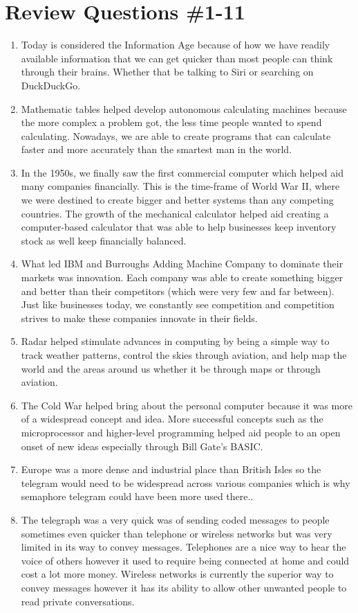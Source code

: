 \documentclass[12pt,a4paper]{article}
\begin{document}
\section{Review Questions \#1-11}
    \begin{enumerate}
        \item Today is considered the Information Age because of how we have readily available information that we can get quicker than most people can think through their brains. Whether that be talking to Siri or searching on DuckDuckGo.
        \item Mathematic tables helped develop autonomous calculating machines because the more complex a problem got, the less time people wanted to spend calculating. Nowadays, we are able to create programs that can calculate faster and more accurately than the smartest man in the world.
        \item In the 1950s, we finally saw the first commercial computer which helped aid many companies financially. This is the time-frame of World War II, where we were destined to create bigger and better systems than any competing countries. The growth of the mechanical calculator helped aid creating a computer-based calculator that was able to help businesses keep inventory stock as well keep financially balanced.
        \item What led IBM and Burroughs Adding Machine Company to dominate their markets was innovation. Each company was able to create something bigger and better than their competitors (which were very few and far between). Just like businesses today, we constantly see competition and competition strives to make these companies innovate in their fields.
        \item Radar helped stimulate advances in computing by being a simple way to track weather patterns, control the skies through aviation, and help map the world and the areas around us whether it be through maps or through aviation.
        \item The Cold War helped bring about the personal computer because it was more of a widespread concept and idea. More successful concepts such as the microprocessor and higher-level programming helped aid people to an open onset of new ideas especially through Bill Gate's BASIC.
        \item Europe was a more dense and industrial place than British Isles so the telegram would need to be widespread across various companies which is why semaphore telegram could have been more used there..
        \item The telegraph was a very quick was of sending coded messages to people sometimes even quicker than telephone or wireless networks but was very limited in its way to convey messages. Telephones are a nice way to hear the voice of others however it used to require being connected at home and could cost a lot more money. Wireless networks is currently the superior way to convey messages however it has its ability to allow other unwanted people to read private conversations. 

\end{enumerate}
\end{document}
